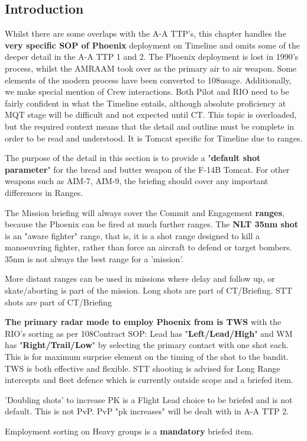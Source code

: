 \subsection{Introduction}

Whilst there are some overlaps with the A-A TTP's, this chapter handles the
\textbf{very specific SOP of Phoenix} deployment on Timeline and omits some of
the deeper detail in the A-A TTP 1 and 2. The Phoenix deployment is lost in
1990's process, whilst the AMRAAM took over as the primary air to air weapon.
Some elements of the modern process have been converted to 108\th usage.
Additionally, we make special mention of Crew interactions. Both Pilot and RIO
need to be fairly confident in what the Timeline entails, although absolute
proficiency at MQT stage will be difficult and not expected until CT. This
topic is overloaded, but the required context means that the detail and outline
must be complete in order to be read and understood. It is Tomcat specific for
Timeline due to ranges.

The purpose of the detail in this section is to provide a "\textbf{default shot
parameter}" for the bread and butter weapon of the F-14B Tomcat. For other
weapons such as AIM-7, AIM-9, the briefing should cover any important
differences in Ranges.

The Mission briefing will always cover the Commit and Engagement
\textbf{ranges}, because the Phoenix can be fired at much further ranges. The
\textbf{NLT 35nm shot} is an "aware fighter" range, that is, it is a shot range
designed to kill a manoeuvring fighter, rather than force an aircraft to defend
or target bombers. 35nm is not always the best range for a 'mission'.

More distant ranges can be used in missions where delay and follow up, or
skate/aborting is part of the mission. Long shots are part of CT/Briefing. STT
shots are part of CT/Briefing

\textbf{The primary radar mode to employ Phoenix from is TWS} with the RIO's
sorting as per 108\th Contract SOP: Lead has "\textbf{Left/Lead/High}" and WM
has "\textbf{Right/Trail/Low}" by selecting the primary contact with one shot
each. This is for maximum surprise element on the timing of the shot to the
bandit. TWS is both effective and flexible. STT shooting is advised for Long
Range intercepts and fleet defence which is currently outside scope and a
briefed item.

'Doubling shots' to increase PK is a Flight Lead choice to be briefed and is
not default. This is not PvP. PvP "pk increases" will be dealt with in A-A TTP
2.

Employment sorting on Heavy groups is a \textbf{mandatory} briefed item.
